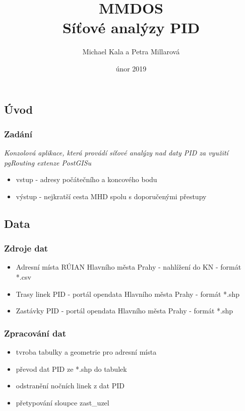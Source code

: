 \documentclass{beamer}
\title{MMDOS \\ Síťové analýzy PID}
\author{Michael Kala a Petra Millarová}
\date{únor 2019}
\begin{document}
\begin{frame}
\titlepage
\end{frame}

\begin{frame}
\section{Úvod}
\frametitle{Zadání}
\begin{block}{}
 \textit{Konzolová aplikace, která provádí síťové analýzy nad daty PID za využití pgRouting extenze PostGISu} 
 \end{block}
 
\begin{itemize}
	\item vstup - adresy počátečního a koncového bodu
	\item výstup - nejkratší cesta MHD spolu s doporučenými přestupy
\end{itemize}
\end{frame}

\begin{frame}
\section{Data}
\frametitle{Zdroje dat}
\begin{itemize}
	\item Adresní místa RÚIAN Hlavního města Prahy - nahlížení do KN - formát *.csv
	\item Trasy linek PID - portál opendata Hlavního města Prahy - formát *.shp
	\item Zastávky PID - portál opendata Hlavního města Prahy - formát *.shp
\end{itemize}
\end{frame}


\begin{frame}
\frametitle{Zpracování dat}
\begin{itemize}
	\item tvroba tabulky a geometrie pro adresní místa
	\item převod dat PID ze *.shp do tabulek
	\item odstranění nočních linek z dat PID
	\item přetypování sloupce zast\_uzel
\end{itemize}
\end{frame}
\end{document}
